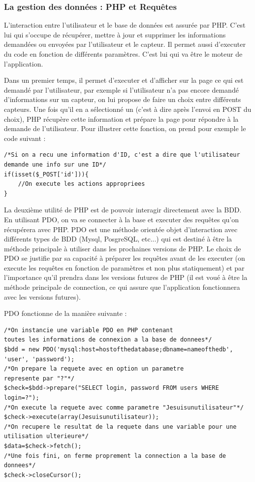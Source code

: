 	\subsubsection{La gestion des données : PHP et Requêtes}
	\par
	L'interaction entre l'utilisateur et le base de données est assurée par PHP. C'est lui qui s'occupe de récupérer, mettre à jour et supprimer les informations demandées ou envoyées par l'utilisateur et le capteur. Il permet aussi d'executer du code en fonction de différents paramètres. C'est lui qui va être le moteur de l'application.
	\par
	Dans un premier temps, il permet d'executer et d'afficher sur la page ce qui est demandé par l'utilisateur, par exemple si l'utilisateur n'a pas encore demandé d'informations sur un capteur, on lui propose de faire un choix entre différents capteurs. Une fois qu'il en a sélectionné un (c'est à dire après l'envoi en POST du choix), PHP récupère cette information et prépare la page pour répondre à la demande de l'utilisateur. Pour illustrer cette fonction, on prend pour exemple le code suivant :
	\\%
	\lstset{language=PHP} 
	\begin{lstlisting}[frame=single]
/*Si on a recu une information d'ID, c'est a dire que l'utilisateur
demande une info sur une ID*/		
if(isset($_POST['id'])){
	//On execute les actions appropriees
}
	\end{lstlisting}
	\par
	La deuxième utilité de PHP est de pouvoir interagir directement avec la BDD. En utilisant PDO, on va se connecter à la base et executer des requêtes qu'on récupérera avec PHP.
	PDO est une méthode orientée objet d'interaction avec différents types de BDD (Mysql, PosgreSQL, etc...) qui est destiné à être la méthode principale à utiliser dans les prochaines versions de PHP. Le choix de PDO se justifie par sa capacité à préparer les requêtes avant de les executer  (on execute les requêtes en fonction de paramètres et non plus statiquement) et par l'importance qu'il prendra dans les versions futures de PHP (il est voué à être la méthode principale de connection, ce qui assure que l'application fonctionnera avec les versions futures).
	\par
	PDO fonctionne de la manière suivante :
	\\%
	\lstset{language=PHP} 
	\begin{lstlisting}[frame=single]
/*On instancie une variable PDO en PHP contenant
toutes les informations de connexion a la base de donnees*/
$bdd = new PDO('mysql:host=hostofthedatabase;dbname=nameofthedb', 
'user', 'password');
/*On prepare la requete avec en option un parametre
represente par "?"*/
$check=$bdd->prepare("SELECT login, password FROM users WHERE
login=?");
/*On execute la requete avec comme parametre "Jesuisunutilisateur"*/
$check->execute(array(Jesuisunutilisateur));
/*On recupere le resultat de la requete dans une variable pour une
utilisation ulterieure*/
$data=$check->fetch();
/*Une fois fini, on ferme proprement la connection a la base de 
donnees*/
$check->closeCursor();
	\end{lstlisting}
		
